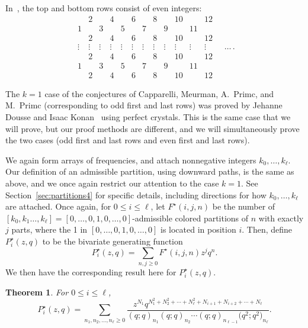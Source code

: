 \documentclass[10pt,a4paper]{amsart}
\numberwithin{equation}{section}
\newtheorem{Theorem}{Theorem}[section]
\theoremstyle{definition}
\begin{document}
In~\cite{primc2023}, the top and bottom rows consist of even integers:
\begin{equation*}
\begin{matrix}
& 2 && 4 && 6 && 8 && 10 && 12\\
1 && 3 && 5 && 7 && 9 && 11 & \\
& 2 && 4 && 6 && 8 && 10 && 12\\
\vdots & \vdots &\vdots& \vdots &\vdots& \vdots &\vdots& \vdots &\vdots& \vdots &\vdots& \vdots\\
& 2 && 4 && 6 && 8 && 10 && 12 \\
1 && 3 && 5 && 7 && 9 && 11 & \\
& 2 && 4 && 6 && 8 && 10 && 12
 \end{matrix}\quad\dots\,.
\end{equation*}

The $k=1$ case of the conjectures of Capparelli, Meurman, A.~Primc, and M.~Primc (corresponding to odd first and last rows) was proved by Jehanne Dousse and Isaac Konan~\cite{DouKon} using perfect crystals. This is the same case that we will prove, but our proof methods are different, and we will simultaneously prove the two cases (odd first and last rows and even first and last rows).

We again form arrays of frequencies, and attach nonnegative integers $k_0,\dots,k_\ell$. Our definition of an admissible partition, using downward paths, is the same as above, and we once again restrict our attention to the case $k=1$. See Section~\ref{sec:partitions4} for specific details, including directions for how $k_0,\dots,k_\ell$ are attached. Once again, for $0 \le i \le \ell$, let $F^\star(i,j,n)$ be the number of $\left[k_0,k_1\dots,k_\ell\right]=\left[0,\dots,0,1,0,\dots,0\right]$-admissible colored partitions of $n$ with exactly $j$ parts, where the 1 in $\left[0,\dots,0,1,0,\dots,0\right]$ is located in position $i$. Then, define $P^\star_{i}(z,q)$ to be the bivariate generating function
\begin{equation*}
P^\star_{i}(z,q)=\sum_{n,j\ge 0} F^\star(i,j,n)z^j q^n.
\end{equation*}
We then have the corresponding result here for $P^\star_i(z,q)$.

\begin{Theorem} \label{thm:mainresult2}
For $0\le i \le \ell$,
\begin{equation} \label{eq:mainresult2}
P^\star_i(z,q)=\sum_{n_1,n_2,\dots,n_{\ell}\ge 0} \frac{z^{N_1}q^{N_1^2+N_2^2+\cdots+N_{\ell}^2+N_{i+1}+N_{i+2}+\cdots+N_{\ell}}}{(q;q)_{n_1}(q;q)_{n_2}\cdots(q;q)_{n_{\ell-1}}\bigl(q^2;q^2\bigr)_{n_{\ell}}}.
\end{equation}
\end{Theorem}
\end{document}
